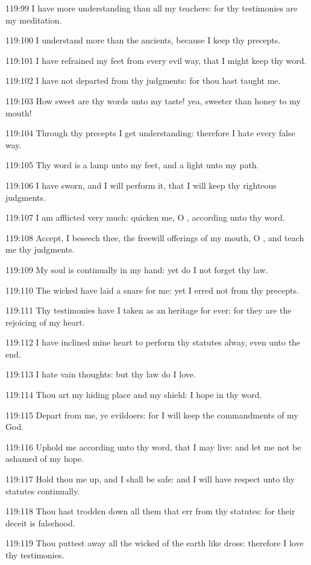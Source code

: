 119:99 I have more understanding than all my teachers: for thy
testimonies are my meditation.

119:100 I understand more than the ancients, because I keep thy
precepts.

119:101 I have refrained my feet from every evil way, that I might
keep thy word.

119:102 I have not departed from thy judgments: for thou hast taught
me.

119:103 How sweet are thy words unto my taste! yea, sweeter than honey
to my mouth!

119:104 Through thy precepts I get understanding: therefore I hate
every false way.

119:105 Thy word is a lamp unto my feet, and a light unto my path.

119:106 I have sworn, and I will perform it, that I will keep thy
righteous judgments.

119:107 I am afflicted very much: quicken me, O \LORD, according unto
thy word.

119:108 Accept, I beseech thee, the freewill offerings of my mouth, O
\LORD, and teach me thy judgments.

119:109 My soul is continually in my hand: yet do I not forget thy
law.

119:110 The wicked have laid a snare for me: yet I erred not from thy
precepts.

119:111 Thy testimonies have I taken as an heritage for ever: for they
are the rejoicing of my heart.

119:112 I have inclined mine heart to perform thy statutes alway, even
unto the end.

119:113 I hate vain thoughts: but thy law do I love.

119:114 Thou art my hiding place and my shield: I hope in thy word.

119:115 Depart from me, ye evildoers: for I will keep the commandments
of my God.

119:116 Uphold me according unto thy word, that I may live: and let me
not be ashamed of my hope.

119:117 Hold thou me up, and I shall be safe: and I will have respect
unto thy statutes continually.

119:118 Thou hast trodden down all them that err from thy statutes:
for their deceit is falsehood.

119:119 Thou puttest away all the wicked of the earth like dross:
therefore I love thy testimonies.

